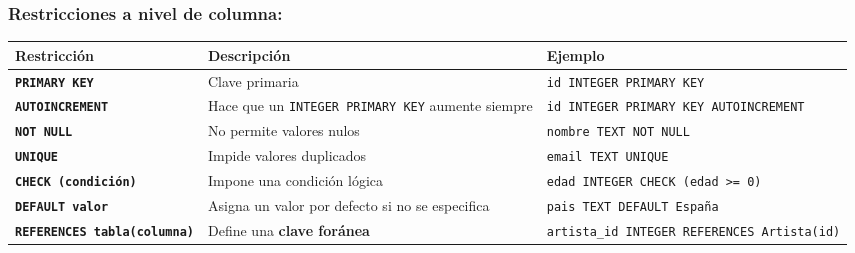 \documentclass[
]{book}
\newcounter{none} %
\theoremstyle{break}
\theoremstyle{nonumberplain}
\begin{document}
\subsubsection{Restricciones a nivel de columna:}\label{restricciones-a-nivel-de-columna}

{\def\LTcaptype{none} %
\begin{longtable}[]{@{}
  >{\raggedright\arraybackslash}p{}
  >{\raggedright\arraybackslash}p{}
  >{\raggedright\arraybackslash}p{}@{}}
\toprule\noalign{}
\begin{minipage}[b]{\linewidth}\raggedright
Restricción
\end{minipage} & \begin{minipage}[b]{\linewidth}\raggedright
Descripción
\end{minipage} & \begin{minipage}[b]{\linewidth}\raggedright
Ejemplo
\end{minipage} \\
\midrule\noalign{}
\endhead
\bottomrule\noalign{}
\endlastfoot
\textbf{\texttt{PRIMARY\ KEY}} & Clave primaria & \texttt{id\ INTEGER\ PRIMARY\ KEY} \\
\textbf{\texttt{AUTOINCREMENT}} & Hace que un \texttt{INTEGER\ PRIMARY\ KEY} aumente siempre & \texttt{id\ INTEGER\ PRIMARY\ KEY\ AUTOINCREMENT} \\
\textbf{\texttt{NOT\ NULL}} & No permite valores nulos & \texttt{nombre\ TEXT\ NOT\ NULL} \\
\textbf{\texttt{UNIQUE}} & Impide valores duplicados & \texttt{email\ TEXT\ UNIQUE} \\
\textbf{\texttt{CHECK\ (condición)}} & Impone una condición lógica & \texttt{edad\ INTEGER\ CHECK\ (edad\ \textgreater{}=\ 0)} \\
\textbf{\texttt{DEFAULT\ valor}} & Asigna un valor por defecto si no se especifica & \texttt{pais\ TEXT\ DEFAULT\ \textquotesingle{}España\textquotesingle{}} \\
\textbf{\texttt{REFERENCES\ tabla(columna)}} & Define una \textbf{clave foránea} & \texttt{artista\_id\ INTEGER\ REFERENCES\ Artista(id)} \\
\end{longtable}
}
\end{document}
